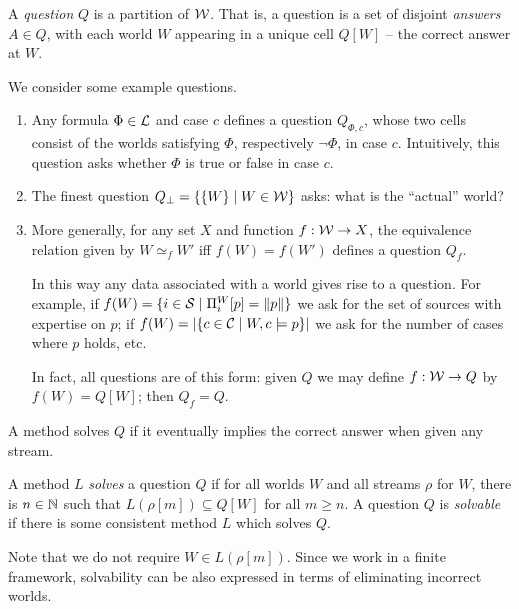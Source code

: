 A \emph{question} $Q$ is a partition of $\mathcal{W}$. That is, a question is a set
of disjoint \emph{answers} $A \in Q$, with each world $W$ appearing in a unique
cell $Q[W]$ -- the correct answer at $W$.

\begin{example}
    \label{tt_ex_questions}
    We consider some example questions.
    \begin{enumerate}
        \item Any formula $\Phi \in \mathcal{L}$ and case $c$ defines a question
              $Q_{\Phi, c}$, whose two cells consist of the worlds satisfying
              $\Phi$, respectively $\neg\Phi$, in case $c$. Intuitively, this
              question asks whether $\Phi$ is true or false in case $c$.
        \item The finest question $Q_\bot = \{\{W\} \mid W \in \mathcal{W}\}$ asks:
              what is the ``actual'' world?
        \item More generally, for any set $X$ and function $f: \mathcal{W} \to X$,
              the equivalence relation given by $W \simeq_f W'$ iff $f(W) =
              f(W')$ defines a question $Q_f$.

              In this way any data associated with a world gives rise to a
              question. For example, if $f(W) = \{i \in \mathcal{S} \mid \Pi^W_i[p]
              = \|{p}\|\}$ we ask for the set of sources with expertise
              on $p$; if $f(W) = |\{c \in \mathcal{C} \mid W, c \models p\}|$ we
              ask for the number of cases where $p$ holds, etc.

              In fact, all questions are of this form: given $Q$ we may define $f:
              \mathcal{W} \to Q$ by $f(W) = Q[W]$; then $Q_f = Q$.
    \end{enumerate}
\end{example}

A method solves $Q$ if it eventually implies the correct answer when given any
stream.

\begin{definition}
    \label{tt_def_solvability}
    A method $L$ \emph{solves} a question $Q$ if for all worlds $W$ and all
    streams $\rho$ for $W$, there is $n \in \mathbb{N}$ such that $L(\rho[m]) \subseteq
    Q[W]$ for all $m \ge n$. A question $Q$ is \emph{solvable} if there is some
    consistent method $L$ which solves $Q$.
\end{definition}

Note that we do not require $W \in L(\rho[m])$.
%
Since we work in a finite framework, solvability can be also expressed
in terms of eliminating incorrect worlds.

